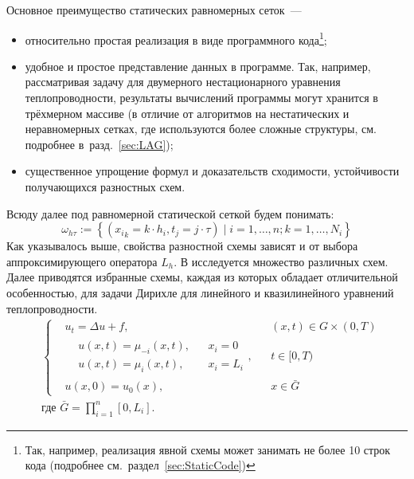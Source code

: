 Основное преимущество статических равномерных сеток~--- 
\begin{itemize}
    \item относительно простая реализация в виде программного кода\footnote{Так, например, реализация явной схемы может занимать не более 10 строк кода (подробнее см.~раздел~\ref{sec:StaticCode})};
    \item удобное и простое представление данных в программе. Так, например, рассматривая задачу для двумерного нестационарного уравнения теплопроводности, результаты вычислений программы могут хранится в трёхмерном массиве (в отличие от алгоритмов на нестатических и неравномерных сетках, где используются более сложные структуры, см. подробнее в~разд.~\ref{sec:LAG});
    \item существенное упрощение формул и доказательств сходимости, устойчивости получающихся разностных схем.
\end{itemize}
Всюду далее под равномерной статической сеткой будем понимать:
\begin{equation*}
    \omega_{h\tau} := \left\{ 
        ({x_i}_k = k \cdot h_i, t_j = j \cdot \tau) \mid 
        i = 1, \ldots, n; k = 1, \ldots, N_i
     \right\}
\end{equation*}
Как указывалось выше, свойства разностной схемы зависят и от выбора аппроксимирующего оператора $L_h$.
В \cite{СамарскийТеорияРазностныхСхем} исследуется множество различных схем.
Далее приводятся избранные схемы, каждая из которых обладает отличительной особенностью, для задачи Дирихле для линейного и квазилинейного уравнений теплопроводности.
\begin{equation*}
    \begin{aligned}
        &\left\{ 
            \begin{aligned}
                & u_t = \Delta u + f, && (x, t) \in G \times (0, T)\\
                & \begin{aligned}
                    & u(x, t) = \mu_{-i}(x, t), && x_i = 0\\
                    & u(x, t) = \mu_{i}(x, t), && x_i = L_i
                \end{aligned}, && t \in [0, T)\\
                &u(x, 0) = u_0(x), && x \in \bar{G}
            \end{aligned}
        \right.\\
        &\text{где } \bar{G} = \prod\limits_{i=1}^{n} [0, L_i].
    \end{aligned}
\end{equation*}
